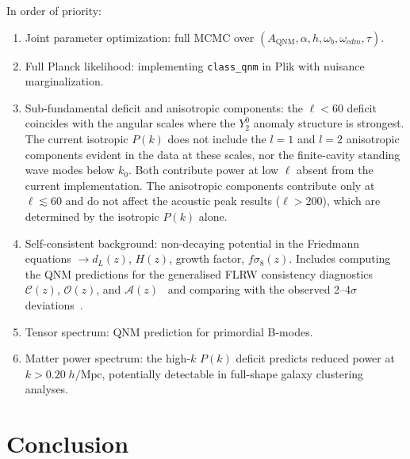 \documentclass[aps,prd,twocolumn,superscriptaddress,showpacs,preprintnumbers,amsmath,amssymb,nofootinbib]{revtex4-2}
\begin{document}
In order of priority:
\begin{enumerate}
\item Joint parameter optimization: full MCMC over $(A_\mathrm{QNM}, \alpha, h, \omega_b, \omega_{cdm}, \tau)$.
\item Full Planck likelihood: implementing \texttt{class\_qnm} in Plik with nuisance marginalization.
\item Sub-fundamental deficit and anisotropic components: the $\ell < 60$ deficit coincides with the angular scales where the $Y_2^0$ anomaly structure is strongest. The current isotropic $P(k)$ does not include the $l = 1$ and $l = 2$ anisotropic components evident in the data at these scales, nor the finite-cavity standing wave modes below $k_0$. Both contribute power at low $\ell$ absent from the current implementation. The anisotropic components contribute only at $\ell \lesssim 60$ and do not affect the acoustic peak results ($\ell > 200$), which are determined by the isotropic $P(k)$ alone.
\item Self-consistent background: non-decaying potential in the Friedmann equations $\to d_L(z)$, $H(z)$, growth factor, $f\sigma_8(z)$. Includes computing the QNM predictions for the generalised FLRW consistency diagnostics $\mathcal{C}(z)$, $\mathcal{O}(z)$, and $\mathcal{A}(z)$~\cite{KoksbangHeinesen2026b,HeinesenClifton2026} and comparing with the observed 2--4$\sigma$ deviations~\cite{KoksbangHeinesen2026a}.
\item Tensor spectrum: QNM prediction for primordial B-modes.
\item Matter power spectrum: the high-$k$ $P(k)$ deficit predicts reduced power at $k > 0.20\;h/\mathrm{Mpc}$, potentially detectable in full-shape galaxy clustering analyses.
\end{enumerate}


\section{Conclusion}
\label{sec:conclusion}
\end{document}
